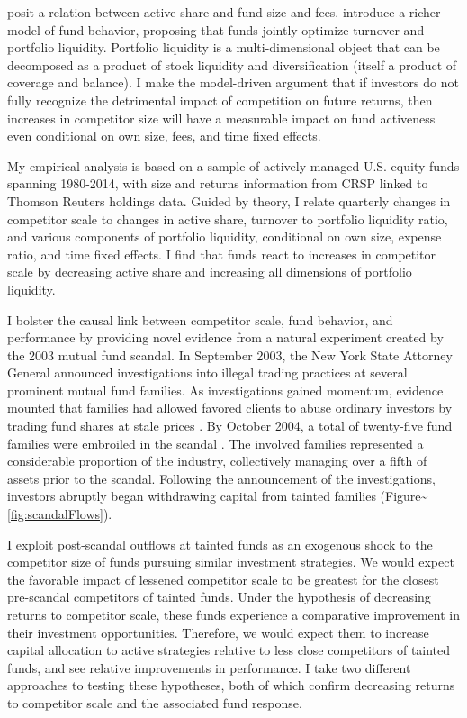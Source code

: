 \documentclass[openany]{book}
\theoremstyle{definition}
\theoremstyle{definition}
\theoremstyle{definition}
\theoremstyle{remark}
\begin{document}
\citet{bg04} posit a relation between active share and fund size and
fees. \citet{pst17L} introduce a richer model of fund behavior,
proposing that funds jointly optimize turnover and portfolio liquidity.
Portfolio liquidity is a multi-dimensional object that can be decomposed
as a product of stock liquidity and diversification (itself a product of
coverage and balance). I make the model-driven argument that if
investors do not fully recognize the detrimental impact of competition
on future returns, then increases in competitor size will have a
measurable impact on fund activeness even conditional on own size, fees,
and time fixed effects.

My empirical analysis is based on a sample of actively managed U.S.
equity funds spanning 1980-2014, with size and returns information from
CRSP linked to Thomson Reuters holdings data. Guided by theory, I relate
quarterly changes in competitor scale to changes in active share,
turnover to portfolio liquidity ratio, and various components of
portfolio liquidity, conditional on own size, expense ratio, and time
fixed effects. I find that funds react to increases in competitor scale
by decreasing active share and increasing all dimensions of portfolio
liquidity.

I bolster the causal link between competitor scale, fund behavior, and
performance by providing novel evidence from a natural experiment
created by the 2003 mutual fund scandal. In September 2003, the New York
State Attorney General announced investigations into illegal trading
practices at several prominent mutual fund families. As investigations
gained momentum, evidence mounted that families had allowed favored
clients to abuse ordinary investors by trading fund shares at stale
prices \citep{zitzewitz06}. By October 2004, a total of twenty-five fund
families were embroiled in the scandal \citep{hw05}. The involved
families represented a considerable proportion of the industry,
collectively managing over a fifth of assets prior to the scandal.
Following the announcement of the investigations, investors abruptly
began withdrawing capital from tainted families
(Figure\textasciitilde{}\ref{fig:scandalFlows}).

I exploit post-scandal outflows at tainted funds as an exogenous shock
to the competitor size of funds pursuing similar investment strategies.
We would expect the favorable impact of lessened competitor scale to be
greatest for the closest pre-scandal competitors of tainted funds. Under
the hypothesis of decreasing returns to competitor scale, these funds
experience a comparative improvement in their investment opportunities.
Therefore, we would expect them to increase capital allocation to active
strategies relative to less close competitors of tainted funds, and see
relative improvements in performance. I take two different approaches to
testing these hypotheses, both of which confirm decreasing returns to
competitor scale and the associated fund response.
\end{document}
